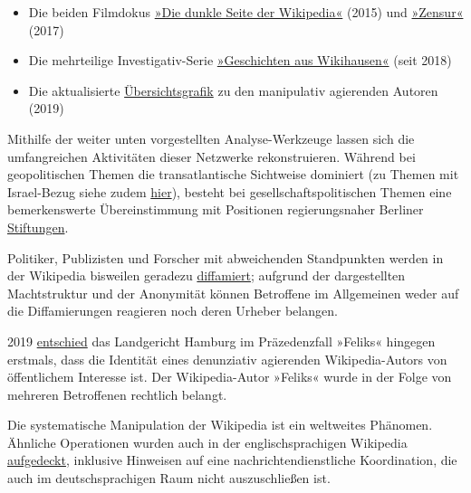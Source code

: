 \begin{itemize}
\tightlist
\item
  Die beiden Filmdokus
  \href{https://www.youtube.com/watch?v=wHfiCX_YdgA}{»Die dunkle Seite
  der Wikipedia«} (2015) und
  \href{https://www.youtube.com/watch?v=tef7bgwInjY}{»Zensur«} (2017)
\item
  Die mehrteilige Investigativ-Serie
  \href{https://www.youtube.com/channel/UCQWqzh6Wcc_2mkBJ5sy3SqA/}{»Geschichten
  aus Wikihausen«} (seit 2018)
\item
  Die aktualisierte
  \href{https://swprs.org/wikipedia-manipulation-autoren/}{Übersichtsgrafik}
  zu den manipulativ agierenden Autoren (2019)
\end{itemize}

Mithilfe der weiter unten vorgestellten Analyse-Werkzeuge lassen sich
die umfangreichen Aktivitäten dieser Netzwerke rekonstruieren. Während
bei geopolitischen Themen die transatlantische Sichtweise dominiert (zu
Themen mit Israel-Bezug siehe zudem
\href{http://www.unz.com/article/how-israel-and-its-partisans-work-to-censor-the-internet/}{hier}),
besteht bei gesell­schafts­politischen Themen eine bemerkenswerte
Übereinstimmung mit Positionen regierungsnaher Berliner
\href{http://www.belltower.news/artikel/task-force-gegen-hassinhalte-im-internet-es-gibt-noch-viel-zu-tun-10780}{Stiftungen}.

Politiker, Publizisten und Forscher mit abweichenden Standpunkten werden
in der Wikipedia bisweilen geradezu
\href{https://kenfm.de/tagesdosis-19-6-2018-die-schauprozesse-der-wikipedia-junta/}{diffamiert};
aufgrund der dargestellten Machtstruktur und der Anonymität können
Betroffene im Allgemeinen weder auf die Diffamierungen reagieren noch
deren Urheber belangen.

2019 \href{https://swprs.org/der-wikipedia-prozess/}{entschied} das
Landgericht Hamburg im Präzedenzfall »Feliks« hingegen erstmals, dass
die Identität eines denunziativ agierenden Wikipedia-Autors von
öffentlichem Interesse ist. Der Wikipedia-Autor »Feliks« wurde in der
Folge von mehreren Betroffenen rechtlich belangt.

Die systematische Manipulation der Wikipedia ist ein weltweites
Phänomen. Ähnliche Operationen wurden auch in der englischsprachigen
Wikipedia
\href{https://de.sputniknews.com/panorama/20180531320955722-philip-cross-wikipedia/}{aufgedeckt},
inklusive Hinweisen auf eine nach­rich­ten­dienstliche Koordination, die
auch im deutschsprachigen Raum nicht auszuschließen ist.

